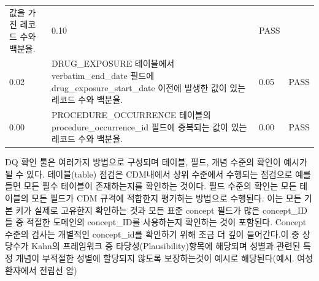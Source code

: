 \documentclass[11pt]{book}
\theoremstyle{definition}
\theoremstyle{definition}
\theoremstyle{definition}
\theoremstyle{remark}
\begin{document}
\begin{longtable}[]{@{}llll@{}}
\begin{minipage}[t]{0.47\columnwidth}
값을 가진 레코드 수와 백분율.\strut
\end{minipage} & \begin{minipage}[t]{0.10\columnwidth}\raggedright\strut
0.10\strut
\end{minipage} & \begin{minipage}[t]{0.07\columnwidth}\raggedright\strut
PASS\strut
\end{minipage}\tabularnewline
\begin{minipage}[t]{0.12\columnwidth}\raggedright\strut
0.02\strut
\end{minipage} & \begin{minipage}[t]{0.47\columnwidth}\raggedright\strut
DRUG\_EXPOSURE 테이블에서 verbatim\_end\_date 필드에
drug\_exposure\_start\_date 이전에 발생한 값이 있는 레코드 수와
백분율.\strut
\end{minipage} & \begin{minipage}[t]{0.10\columnwidth}\raggedright\strut
0.05\strut
\end{minipage} & \begin{minipage}[t]{0.07\columnwidth}\raggedright\strut
PASS\strut
\end{minipage}\tabularnewline
\begin{minipage}[t]{0.12\columnwidth}\raggedright\strut
0.00\strut
\end{minipage} & \begin{minipage}[t]{0.47\columnwidth}\raggedright\strut
PROCEDURE\_OCCURRENCE 테이블의 procedure\_occurrence\_id 필드에 중복되는
값이 있는 레코드 수와 백분율.\strut
\end{minipage} & \begin{minipage}[t]{0.10\columnwidth}\raggedright\strut
0.00\strut
\end{minipage} & \begin{minipage}[t]{0.07\columnwidth}\raggedright\strut
PASS\strut
\end{minipage}\tabularnewline
\bottomrule
\end{longtable}

DQ 확인 툴은 여러가지 방법으로 구성되며 테이블, 필드, 개념 수준의 확인이
예시가 될 수 있다. 테이블(table) 점검은 CDM내에서 상위 수준에서 수행되는
점검으로 예를 들면 모든 필수 테이블이 존재하는지를 확인하는 것이다. 필드
수준의 확인는 모든 테이블의 모든 필드가 CDM 규격에 적합한지 평가하는
방법으로 수행된다. 이는 모든 기본 키가 실제로 고유한지 확인하는 것과
모든 표준 concept 필드가 많은 concept\_ID들 중 적절한 도메인의
concept\_ID를 사용하는지 확인하는 것이 포함된다. Concept 수준의 검사는
개별적인 concept\_id를 확인하기 위해 조금 더 깊이 들어간다.이 중
상당수가 Kahn의 프레임워크 중 타당성(Plausibility)항목에 해당되며 성별과
관련된 특정 개념이 부적절한 성별에 할당되지 않도록 보장하는것이 예시로
해당된다(예시. 여성 환자에서 전립선 암)
\end{document}
